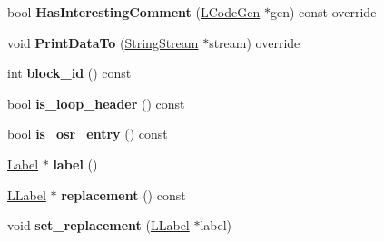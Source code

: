 \begin{DoxyCompactItemize}
\item 
bool {\bfseries Has\+Interesting\+Comment} (\hyperlink{classv8_1_1internal_1_1_l_code_gen}{L\+Code\+Gen} $\ast$gen) const  override\hypertarget{classv8_1_1internal_1_1_l_label_aa0a8236af4aaa8c0433e5082df86d31a}{}\label{classv8_1_1internal_1_1_l_label_aa0a8236af4aaa8c0433e5082df86d31a}

\item 
void {\bfseries Print\+Data\+To} (\hyperlink{classv8_1_1internal_1_1_string_stream}{String\+Stream} $\ast$stream) override\hypertarget{classv8_1_1internal_1_1_l_label_ac1318b8f414140c11ee85e3acd00491f}{}\label{classv8_1_1internal_1_1_l_label_ac1318b8f414140c11ee85e3acd00491f}

\item 
int {\bfseries block\+\_\+id} () const \hypertarget{classv8_1_1internal_1_1_l_label_a87739f07ada487049bd402d117ea0bdc}{}\label{classv8_1_1internal_1_1_l_label_a87739f07ada487049bd402d117ea0bdc}

\item 
bool {\bfseries is\+\_\+loop\+\_\+header} () const \hypertarget{classv8_1_1internal_1_1_l_label_a310f97c551f5ab43f42ef04d2b97b349}{}\label{classv8_1_1internal_1_1_l_label_a310f97c551f5ab43f42ef04d2b97b349}

\item 
bool {\bfseries is\+\_\+osr\+\_\+entry} () const \hypertarget{classv8_1_1internal_1_1_l_label_a2a98f2b24dada94a6a1e4f78b0cb88be}{}\label{classv8_1_1internal_1_1_l_label_a2a98f2b24dada94a6a1e4f78b0cb88be}

\item 
\hyperlink{classv8_1_1internal_1_1_label}{Label} $\ast$ {\bfseries label} ()\hypertarget{classv8_1_1internal_1_1_l_label_aad0d2d6e266d7d6ee11d0d4d2e4342c8}{}\label{classv8_1_1internal_1_1_l_label_aad0d2d6e266d7d6ee11d0d4d2e4342c8}

\item 
\hyperlink{classv8_1_1internal_1_1_l_label}{L\+Label} $\ast$ {\bfseries replacement} () const \hypertarget{classv8_1_1internal_1_1_l_label_aeae2ce751911693b33505ace069c9f38}{}\label{classv8_1_1internal_1_1_l_label_aeae2ce751911693b33505ace069c9f38}

\item 
void {\bfseries set\+\_\+replacement} (\hyperlink{classv8_1_1internal_1_1_l_label}{L\+Label} $\ast$label)\hypertarget{classv8_1_1internal_1_1_l_label_a05875ed6601582974b107974f2720dc6}{}\label{classv8_1_1internal_1_1_l_label_a05875ed6601582974b107974f2720dc6}


\end{DoxyCompactItemize}
